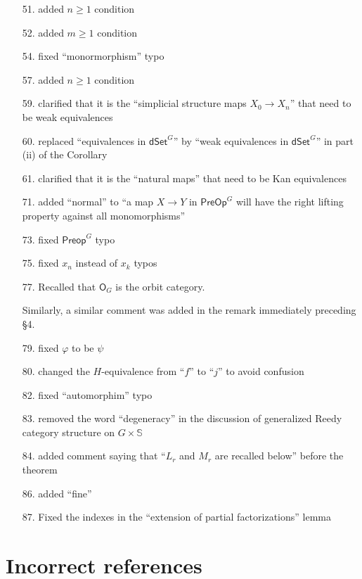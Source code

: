 \documentclass{article}
\begin{document}
\begin{itemize}
\item[51.] added $n \geq 1$ condition
\item[52.] added $m \geq 1$ condition
\item[54.] fixed ``monormorphism'' typo
\item[57.] added $n \geq 1$ condition
\item[59.] clarified that it is the ``simplicial structure maps $X_0 \to X_n$'' that need to be weak equivalences
\item[60.] replaced ``equivalences in $\mathsf{dSet}^G$'' by ``weak equivalences in $\mathsf{dSet}^G$'' in part (ii) of the Corollary
\item[61.] clarified that it is the ``natural maps'' that need to be Kan equivalences
\item[71.] added ``normal'' to ``a map $X\to Y$ in $\mathsf{PreOp}^G$ will have the right lifting property against all monomorphisms''
\item[73.] fixed $\mathsf{Preop}^G$ typo
\item[75.] fixed $x_n$ instead of $x_k$ typos
\item[77.] Recalled that $\mathsf{O}_G$ is the orbit category.

Similarly, a similar comment was added in the remark immediately preceding \S 4.
\item[79.] fixed $\varphi$ to be $\psi$
\item[80.] changed the $H$-equivalence from ``$f$'' to ``$j$'' to avoid confusion
\item[82.] fixed ``automorphim'' typo
\item[83.] removed the word ``degeneracy'' in the discussion of generalized Reedy category structure on $G \times \mathbb{S}$
\item[84.] added comment saying that ``$L_r$ and $M_r$ are recalled below'' before the theorem
\item[86.] added ``fine''
\item[87.] Fixed the indexes in the ``extension of partial factorizations'' lemma
\end{itemize}




\section{Incorrect references}
\end{document}
